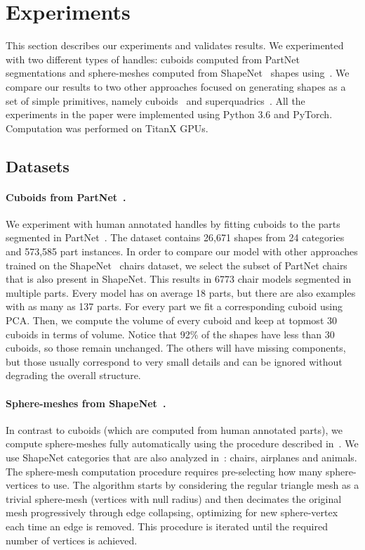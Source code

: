 \section{Experiments}
\label{sec:experiments}

This section describes our experiments and validates results.
We experimented with two different types of handles:
cuboids computed from PartNet~\cite{partnet} segmentations and
sphere-meshes computed from ShapeNet~\cite{shapenet} shapes using~\cite{spheremesh}.
We compare our results to two other approaches focused on generating shapes
as a set of simple primitives, namely cuboids~\cite{Tulsiani2017} 
and superquadrics~\cite{Paschalidou2019}.
All the experiments in the paper were implemented using Python 3.6
and PyTorch.
Computation was performed on TitanX GPUs.

\subsection{Datasets}
\paragraph{Cuboids from PartNet~\cite{partnet}.}
We experiment with human annotated handles by fitting cuboids to the parts
segmented in PartNet~\cite{partnet}.
The dataset contains 26,671 shapes from 24 categories and 573,585 part instances.
In order to compare our model with other approaches trained
on the ShapeNet~\cite{shapenet} chairs dataset, we select the subset of PartNet chairs
that is also present in ShapeNet.
This results in 6773 chair models segmented in multiple parts.
Every model has on average 18 parts, but there are also examples with as many as 137 parts.
For every part we fit a corresponding cuboid using PCA. 
Then, we compute the volume of every cuboid and keep at topmost 30 cuboids in terms of volume.
Notice that 92\% of the shapes have less than 30 cuboids, so those remain unchanged.
The others will have missing components, but those usually correspond to very small details
and can be ignored without degrading the overall structure.

\paragraph{Sphere-meshes from ShapeNet~\cite{shapenet}.}
In contrast to cuboids (which are computed from human annotated parts), we compute sphere-meshes fully automatically using the procedure
described in~\cite{spheremesh}.
We use ShapeNet categories that are also analyzed in~\cite{Paschalidou2019, Tulsiani2017}:
chairs, airplanes and animals.
The sphere-mesh computation procedure requires pre-selecting how many sphere-vertices to use.
The algorithm starts by considering the regular triangle mesh as a trivial sphere-mesh (vertices with null radius) and then decimates the
original mesh progressively through edge collapsing, optimizing for new sphere-vertex each time an edge is removed.
This procedure is iterated until the required number of vertices is achieved.

